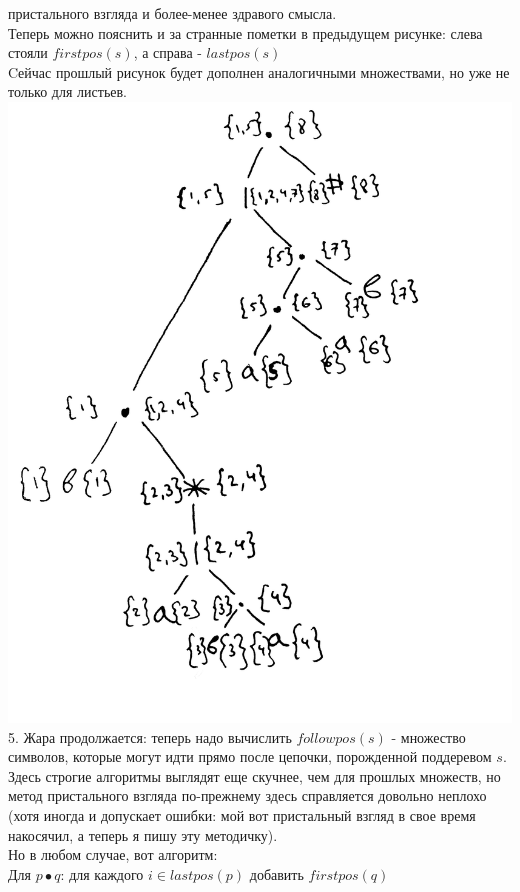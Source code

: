 \documentclass[14pt]{extreport}
\begin{document}
	пристального взгляда и более-менее здравого смысла.\\
	Теперь можно пояснить и за странные пометки в предыдущем рисунке: слева стояли $firstpos(s)$,
	а справа - $lastpos(s)$\\
	Cейчас прошлый рисунок будет дополнен аналогичными множествами, но уже не только для листьев.\\
	\includegraphics[scale=0.14]{data/pic3_2.png}\\
	5. Жара продолжается: теперь надо вычислить $followpos(s)$ - множество символов, которые могут
	идти прямо после цепочки, порожденной поддеревом $s$.\\
	Здесь строгие алгоритмы выглядят еще скучнее, чем для прошлых множеств, но метод пристального
	взгляда по-прежнему здесь справляется довольно неплохо (хотя иногда и допускает ошибки: мой
	вот пристальный взгляд в свое время накосячил, а теперь я пишу эту методичку).\\
	Но в любом случае, вот алгоритм:\\
	\hspace*{30pt}Для $p \bullet q$: для каждого $i \in lastpos(p)$ добавить $firstpos(q)$
\end{document}
